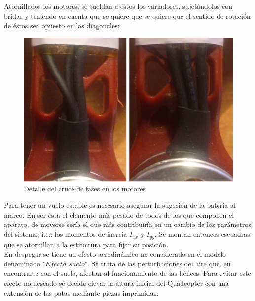 \documentclass[twoside,11pt]{report}
\begin{document}
Atornillados los motores, se sueldan a éstos los variadores, sujetándolos con bridas y teniendo en cuenta que se quiere que se quiere que el sentido de rotación de éstos sea opuesto en las diagonales:\\

\begin{figure}[h!]
\begin{center}
\includegraphics[scale=0.15]{images/comp_motor_wires.jpeg}
\end{center}
\caption{Detalle del cruce de fases en los motores}
\label{detalle_cable_motor}
\end{figure}

Para tener un vuelo estable es necesario asegurar la sugeción de la batería al marco. En ser ésta el elemento más pesado de todos de los que componen el aparato, de moverse sería el que más contribuiría en un cambio de los parámetros del sistema, i.e.: los momentos de inercia $I_{xx}$ y $I_{yy}$. Se montan entonces escuadras que se atornillan a la estructura para fijar su posición. \\

En despegar se tiene un efecto aerodinámico no considerado en el modelo denominado "$Efecto \>\> suelo$". Se trata de las perturbaciones del aire que, en encontrarse con el suelo, afectan al funcionamiento de las hélices. Para evitar este efecto no deseado se decide elevar la altura inicial del Quadcopter con una extensión de las patas mediante piezas imprimidas: \\
\end{document}
